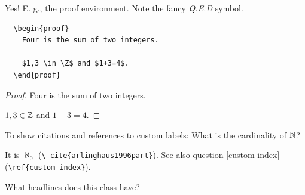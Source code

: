\documentclass{homework}
\newcommand*{\bk}{\textbackslash}
\renewcommand\tt[1]{\texttt{#1}}
\begin{document}
\begin{sol}
  Yes! E. g., the proof environment. Note the fancy \textit{Q.E.D} symbol.

  \vspace*{1em}
  \begin{minipage}{0.45\textwidth}
    \begin{verbatim}
  \begin{proof}
    Four is the sum of two integers.

    $1,3 \in \Z$ and $1+3=4$.
  \end{proof}
    \end{verbatim}
  \end{minipage}
  \hfill
  \begin{minipage}{0.45\textwidth} \hspace{1.9em}
    \begin{proof}
      Four is the sum of two integers.

      $1,3 \in \mathbb{Z}$ and $1+3=4$.
    \end{proof}
  \end{minipage}
\end{sol}

\question\label{cardinality} To show citations and references to
custom labels: What is the cardinality of $\mathbb{N}$?

\begin{sol}
  It is $\aleph_0$ \cite{arlinghaus1996part} (\tt{\bk
    cite\{arlinghaus1996part\}}). See also question \ref{custom-index}
  (\tt{\bk ref\{custom-index\}}).
\end{sol}

\question What headlines does this class have?
\end{document}
